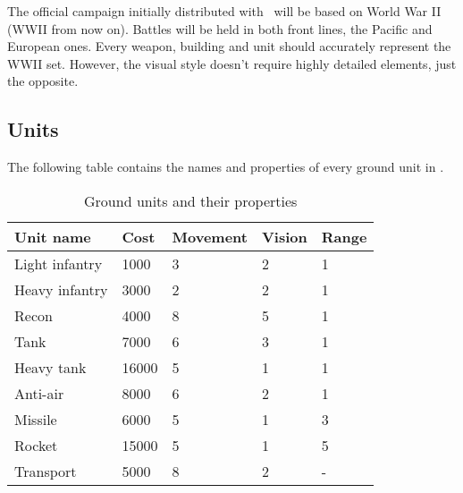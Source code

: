 The official campaign initially distributed with \game\ will be based on World
War II (WWII from now on). Battles will be held in both front lines, the Pacific
and European ones. Every weapon, building and unit should accurately represent
the WWII set. However, the visual style doesn't require highly detailed
elements, just the opposite.\\

\subsection{Units}


The following table contains the names and properties of every ground unit in
\game.\\

\begin{table}[H]
    \label{tab:ground-units}
    \begin{center}
    \begin{tabular}{| l | m{1cm} | m{1.7cm} | m{1.0cm} | m{1.5cm} |}
        \hline
        \textbf{Unit name} & \textbf{Cost} & \textbf{Movement} & \textbf{Vision} & \textbf{Range}\\
        \hline
        Light infantry & 1000 & 3 & 2  & 1 \\
        \hline
        Heavy infantry & 3000 & 2 & 2 & 1 \\
        \hline
        Recon & 4000 & 8 & 5 & 1 \\
        \hline
        Tank & 7000 & 6 & 3 & 1 \\
        \hline
        Heavy tank & 16000 & 5 & 1 & 1 \\
        \hline
        Anti-air & 8000 & 6 & 2 & 1 \\
        \hline
        Missile & 6000 & 5 & 1 & 3 \\
        \hline
        Rocket & 15000 & 5 & 1 & 5 \\
        \hline
        Transport & 5000 & 8 & 2 & - \\
        \hline
    \end{tabular}
    \end{center}
\caption{Ground units and their properties}
\end{table}



